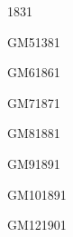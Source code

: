 \documentclass[a4paper,11pt]{report}
\begin{document}
\begin{QSJ}{183}{1}
\end{QSJ}
\begin{exol}{GM5}{138}{1}       %
\end{exol}
\begin{exof}{GM6}{186}{1}       %
\end{exof}  
\begin{exof}{GM7}{187}{1}       %
\end{exof}
\begin{exof}{GM8}{188}{1}       %
\end{exof}
\begin{exof}{GM9}{189}{1}       %
\end{exof}
\begin{exof}{GM10}{189}{1}      %
\end{exof}
\begin{exof}{GM12}{190}{1}      %
\end{exof}





\end{document}
